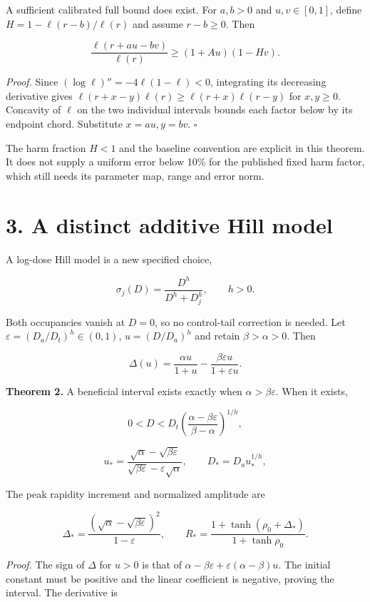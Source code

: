 \documentclass[
  11pt,
  a4paper,
]{article}
\begin{document}
A sufficient calibrated full bound does exist. For \(a,b>0\) and \(u,v\in[0,1]\), define \(H=1-\ell(r-b)/\ell(r)\) and assume \(r-b\ge0\). Then

\[\frac{\ell(r+au-bv)}{\ell(r)}\ge(1+Au)(1-Hv).\]

\emph{Proof.} Since \((\log\ell)''=-4\ell(1-\ell)<0\), integrating its decreasing derivative gives \(\ell(r+x-y)\ell(r)\ge\ell(r+x)\ell(r-y)\) for \(x,y\ge0\). Concavity of \(\ell\) on the two individual intervals bounds each factor below by its endpoint chord. Substitute \(x=au,y=bv\). \(\square\)

The harm fraction \(H<1\) and the baseline convention are explicit in this theorem. It does not supply a uniform error below 10\% for the published fixed harm factor, which still needs its parameter map, range and error norm.

\section{3. A distinct additive Hill model}\label{a-distinct-additive-hill-model}

A log-dose Hill model is a new specified choice,

\[\sigma_j(D)=\frac{D^h}{D^h+D_j^h},\qquad h>0.\]

Both occupancies vanish at \(D=0\), so no control-tail correction is needed. Let \(\varepsilon=(D_a/D_t)^h\in(0,1)\), \(u=(D/D_a)^h\) and retain \(\beta>\alpha>0\). Then

\[\Delta(u)=\frac{\alpha u}{1+u}-\frac{\beta\varepsilon u}{1+\varepsilon u}.\]

\textbf{Theorem 2.} A beneficial interval exists exactly when \(\alpha>\beta\varepsilon\). When it exists,

\[0<D<D_t\left(\frac{\alpha-\beta\varepsilon}{\beta-\alpha}\right)^{1/h},\]

\[u_*=
\frac{\sqrt\alpha-\sqrt{\beta\varepsilon}}
{\sqrt{\beta\varepsilon}-\varepsilon\sqrt\alpha},
\qquad D_*=D_a u_*^{1/h},\]

The peak rapidity increment and normalized amplitude are

\[\Delta_*=
\frac{(\sqrt\alpha-\sqrt{\beta\varepsilon})^2}{1-\varepsilon},
\qquad
R_*=
\frac{1+\tanh(\rho_0+\Delta_*)}{1+\tanh\rho_0}.\]

\emph{Proof.} The sign of \(\Delta\) for \(u>0\) is that of \(\alpha-\beta\varepsilon+\varepsilon(\alpha-\beta)u\). The initial constant must be positive and the linear coefficient is negative, proving the interval. The derivative is
\end{document}
